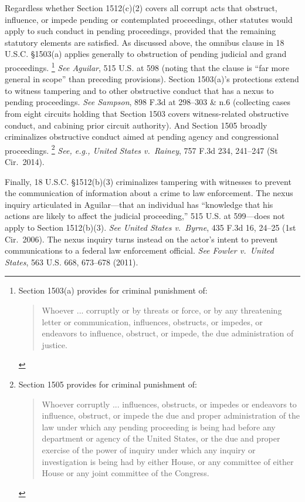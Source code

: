 Regardless whether Section 1512(c)(2) covers all corrupt acts that obstruct, influence, or impede pending or contemplated proceedings, other statutes would apply to such conduct in pending proceedings, provided that the remaining statutory elements are satisfied.
As discussed above, the omnibus clause in 18 U.S.C. \S 1503(a) applies generally to obstruction of pending judicial and grand proceedings.%
\footnote{Section 1503(a) provides for criminal punishment of:
\begin{quote}
Whoever ... corruptly or by threats or force, or by any threatening letter or communication, influences, obstructs, or impedes, or endeavors to influence, obstruct, or impede, the due administration of justice.
\end{quote}}
\textit{See Aguilar}, 515 U.S. at 598 (noting that the clause is “far more general in scope” than preceding provisions).
Section 1503(a)’s protections extend to witness tampering and to other obstructive conduct that has a nexus to pending proceedings.
\textit{See Sampson}, 898 F.3d at 298--303 \& n.6 (collecting cases from eight circuits holding that Section 1503 covers witness-related obstructive conduct, and cabining prior circuit authority).
And Section 1505 broadly criminalizes obstructive conduct aimed at pending agency and congressional proceedings.%
\footnote{Section 1505 provides for criminal punishment of:
\begin{quote}
Whoever corruptly ... influences, obstructs, or impedes or endeavors to influence, obstruct, or impede the due and proper administration of the law under which any pending proceeding is being had before any department or agency of the United States, or the due and proper exercise of the power of inquiry under which any inquiry or investigation is being had by either House, or any committee of either House or any joint committee of the Congress.
\end{quote}}
\textit{See, e.g., United States v.\ Rainey}, 757 F.3d 234, 241--247 (St Cir.~2014).

Finally, 18 U.S.C. \S 1512(b)(3) criminalizes tampering with witnesses to prevent the communication of information about a crime to law enforcement.
The nexus inquiry articulated in Aguilar---that an individual has “knowledge that his actions are likely to affect the judicial proceeding,” 515 U.S. at 599---does not apply to Section 1512(b)(3).
\textit{See United States v.\ Byrne}, 435 F.3d 16, 24--25 (1st Cir.~2006).
The nexus inquiry turns instead on the actor’s intent to prevent communications to a federal law enforcement official.
\textit{See Fowler v.\ United States}, 563 U.S. 668, 673--678 (2011).

